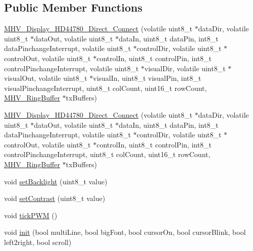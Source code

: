 \subsection*{\-Public \-Member \-Functions}
\begin{DoxyCompactItemize}
\item 
\hyperlink{class_m_h_v___display___h_d44780___direct___connect_aff6a1573f1a8645a063db20eb6e25d4b}{\-M\-H\-V\-\_\-\-Display\-\_\-\-H\-D44780\-\_\-\-Direct\-\_\-\-Connect} (volatile uint8\-\_\-t $\ast$data\-Dir, volatile uint8\-\_\-t $\ast$data\-Out, volatile uint8\-\_\-t $\ast$data\-In, uint8\-\_\-t data\-Pin, int8\-\_\-t data\-Pinchange\-Interrupt, volatile uint8\-\_\-t $\ast$control\-Dir, volatile uint8\-\_\-t $\ast$control\-Out, volatile uint8\-\_\-t $\ast$control\-In, uint8\-\_\-t control\-Pin, int8\-\_\-t control\-Pinchange\-Interrupt, volatile uint8\-\_\-t $\ast$visual\-Dir, volatile uint8\-\_\-t $\ast$visual\-Out, volatile uint8\-\_\-t $\ast$visual\-In, uint8\-\_\-t visual\-Pin, int8\-\_\-t visual\-Pinchange\-Interrupt, uint8\-\_\-t col\-Count, uint16\-\_\-t row\-Count, \hyperlink{class_m_h_v___ring_buffer}{\-M\-H\-V\-\_\-\-Ring\-Buffer} $\ast$tx\-Buffers)
\item 
\hyperlink{class_m_h_v___display___h_d44780___direct___connect_a79d76076ec6c495387f0d36bbeb7d2ab}{\-M\-H\-V\-\_\-\-Display\-\_\-\-H\-D44780\-\_\-\-Direct\-\_\-\-Connect} (volatile uint8\-\_\-t $\ast$data\-Dir, volatile uint8\-\_\-t $\ast$data\-Out, volatile uint8\-\_\-t $\ast$data\-In, uint8\-\_\-t data\-Pin, int8\-\_\-t data\-Pinchange\-Interrupt, volatile uint8\-\_\-t $\ast$control\-Dir, volatile uint8\-\_\-t $\ast$control\-Out, volatile uint8\-\_\-t $\ast$control\-In, uint8\-\_\-t control\-Pin, int8\-\_\-t control\-Pinchange\-Interrupt, uint8\-\_\-t col\-Count, uint16\-\_\-t row\-Count, \hyperlink{class_m_h_v___ring_buffer}{\-M\-H\-V\-\_\-\-Ring\-Buffer} $\ast$tx\-Buffers)
\item 
void \hyperlink{class_m_h_v___display___h_d44780___direct___connect_a11b8f4c551c0c622874b4242154d9d67}{set\-Backlight} (uint8\-\_\-t value)
\item 
void \hyperlink{class_m_h_v___display___h_d44780___direct___connect_a5d890e072d56c818442b209b9d4851d8}{set\-Contrast} (uint8\-\_\-t value)
\item 
void \hyperlink{class_m_h_v___display___h_d44780___direct___connect_a37c4c7d338ce1a335f18649d302dc6a5}{tick\-P\-W\-M} ()
\item 
void \hyperlink{class_m_h_v___display___h_d44780___direct___connect_a82d09a64c377a8b25751a9b21d9cee93}{init} (bool multi\-Line, bool big\-Font, bool cursor\-On, bool cursor\-Blink, bool left2right, bool scroll)
\end{DoxyCompactItemize}
